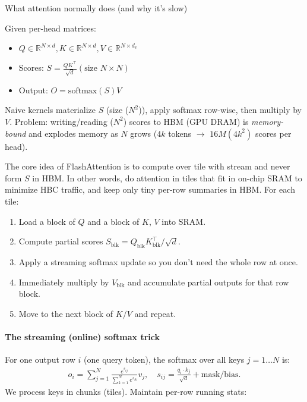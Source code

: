 What attention normally does (and why it's slow)

Given per-head matrices:
\begin{itemize}
	\item$Q \in \mathbb{R}^{N\times d}, K \in \mathbb{R}^{N\times d}, V \in \mathbb{R}^{N\times d_v}$ 
	\item Scores: $S = \frac{QK^\top}{\sqrt{d}}  (\text{size } N\times N)$
	\item Output: $O = \mathrm{softmax}(S)V$
\end{itemize}
Naive kernels materialize $S$ (size ($N^2$)), apply softmax row-wise, then multiply by $V$.
Problem: writing/reading ($N^2$) scores to HBM (GPU DRAM) is \textit{memory-bound} and explodes memory as $N$ grows (\eg $4k$ tokens $\to$ $16M (4k^2)$ scores per head).

The core idea of FlashAttention is to compute over tile with stream and never form $S$ in HBM. In other words, do attention in tiles that fit in on-chip SRAM to minimize HBC traffic, and keep only tiny per-row summaries in HBM. For each tile:

\begin{enumerate}
	\item Load a block of $Q$ and a block of $K$, $V$ into SRAM.
	\item Compute partial scores $S_{\text{blk}} = Q_{\text{blk}}K_{\text{blk}}^\top/\sqrt{d}$.
	\item Apply a streaming softmax update so you don't need the whole row at once.
	\item Immediately multiply by $V_{\text{blk}}$ and accumulate partial
		outputs for that row block.
	\item Move to the next block of $K/V$ and repeat.
\end{enumerate}

\paragraph{The streaming (online) softmax trick}

For one output row $i$ (one query token), the softmax over all keys $j=1\ldots N$ is:
\begin{align*}
	o_i = \sum_{j=1}^N \frac{e^{s_{ij}}}{\sum_{k=1}^N e^{s_{ik}}} v_j,
	\quad s_{ij} = \frac{q_i\cdot k_j}{\sqrt{d}} + \text{mask/bias}.
\end{align*}
We process keys in chunks (\ie tiles). Maintain per-row running stats:

